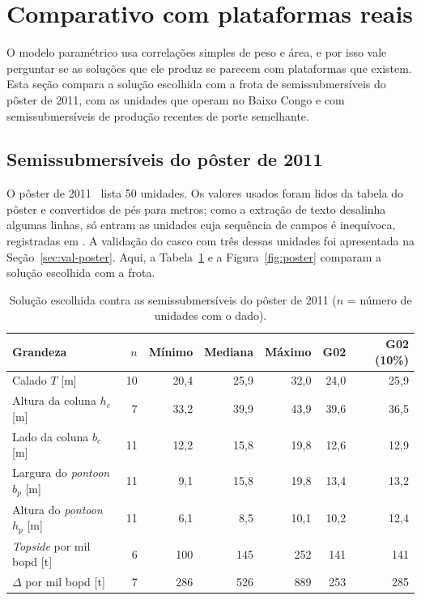 \documentclass[11pt,a4paper]{article}
\begin{document}
\section{Comparativo com plataformas reais}\label{sec:reais}

O modelo paramétrico usa correlações simples de peso e área, e por isso vale perguntar se as
soluções que ele produz se parecem com plataformas que existem. Esta seção compara a solução
escolhida com a frota de semissubmersíveis do pôster de 2011, com as unidades que operam no Baixo
Congo e com semissubmersíveis de produção recentes de porte semelhante.

\subsection{Semissubmersíveis do pôster de 2011}

O pôster de 2011~\cite{poster} lista 50 unidades. Os valores usados foram lidos da tabela do pôster e
convertidos de pés para metros; como a extração de texto desalinha algumas linhas, só entram as
unidades cuja sequência de campos é inequívoca, registradas em
. A validação do casco com três
dessas unidades foi apresentada na Seção~\ref{sec:val-poster}. Aqui, a Tabela~\ref{tab:frota} e a
Figura~\ref{fig:poster} comparam a solução escolhida com a frota.

\begin{table}[!htb]
\centering
\caption[Solução escolhida contra a frota do pôster de 2011]{Solução escolhida contra as
semissubmersíveis do pôster de 2011 ($n$ = número de unidades com o dado).}\label{tab:frota}
\small
\begin{tabular}{lrrrrrr}
\toprule
Grandeza & $n$ & Mínimo & Mediana & Máximo & G02 & G02 (10\%) \\
\midrule
Calado $T$ [m] & 10 & 20,4 & 25,9 & 32,0 & 24,0 & 25,9 \\
Altura da coluna $h_c$ [m] & 7 & 33,2 & 39,9 & 43,9 & 39,6 & 36,5 \\
Lado da coluna $b_c$ [m] & 11 & 12,2 & 15,8 & 19,8 & 12,6 & 12,9 \\
Largura do \emph{pontoon} $b_p$ [m] & 11 & 9,1 & 15,8 & 19,8 & 13,4 & 13,2 \\
Altura do \emph{pontoon} $h_p$ [m] & 11 & 6,1 & 8,5 & 10,1 & 10,2 & 12,4 \\
\emph{Topside} por mil bopd [t] & 6 & 100 & 145 & 252 & 141 & 141 \\
$\Delta$ por mil bopd [t] & 7 & 286 & 526 & 889 & 253 & 285 \\
\bottomrule
\end{tabular}
\end{table}
\end{document}
